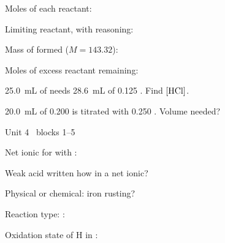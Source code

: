 \documentclass{apchem-worksheet}
\begin{document}
\begin{parts}
  \item Moles of each reactant:
  \item Limiting reactant, with reasoning: \workspace[2cm]
  \item Mass of  formed ($M = 143.32$):
  \item Moles of excess reactant remaining:
\end{parts}

\begin{parts}
  \item \SI{25.0}{\milli\liter} of  needs \SI{28.6}{\milli\liter}
        of \SI{0.125}{\Molar} . Find $[\ce{HCl}]$.
  \item \SI{20.0}{\milli\liter} of \SI{0.200}{\Molar}  is
        titrated with \SI{0.250}{\Molar} . Volume needed?
        \workspace[2.2cm]
\end{parts}

\begin{spiralstrip}{Unit 4 \textbullet\ blocks 1--5}
  \item Net ionic for  with :
  \item Weak acid written how in a net ionic?
  \item Physical or chemical: iron rusting?
  \item Reaction type: : 
  \item Oxidation state of H in : 
\end{spiralstrip}
\end{document}
